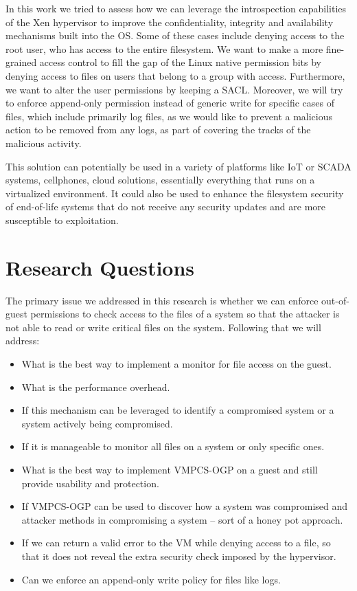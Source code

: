 \par In this work we tried to assess how we can leverage the introspection capabilities of the Xen hypervisor to improve the confidentiality, integrity and availability mechanisms built into the \ac{OS}. Some of these cases include denying access to the root user, who has access to the entire filesystem. We want to make a more fine-grained access control to fill the gap of the Linux native permission bits by denying access to files on users that belong to a group with access. Furthermore, we want to alter the user permissions by keeping a \ac{SACL}. Moreover, we will try to enforce append-only permission instead of generic write for specific cases of files, which include primarily log files, as we would like to prevent a malicious action to be removed from any logs, as part of covering the tracks of the malicious activity. 

\par This solution can potentially be used in a variety of platforms like \ac{IoT} or \ac{SCADA} systems, cellphones, cloud solutions, essentially everything that runs on a virtualized environment. It could also be used to enhance the filesystem security of end-of-life systems that do not receive any security updates and are more susceptible to exploitation.

\section{Research Questions}\label{sec:question}
\par The primary issue we addressed in this research is whether we can enforce out-of-guest permissions to check access to the files of a system so that the attacker is not able to read or write critical files on the system. Following that we will address:
\begin{itemize}
	\item What is the best way to implement a monitor for file access on the guest.
	\item What is the performance overhead.
	\item If this mechanism can be leveraged to identify a compromised system or a system actively being compromised.
	\item If it is manageable to monitor all files on a system or only specific ones. 
	\item What is the best way to implement \ac{VMPCS-OGP} on a guest and still provide usability and protection.
	\item If \ac{VMPCS-OGP} can be used to discover how a system was compromised and attacker methods in compromising a system – sort of a honey pot approach.
	\item If we can return a valid error to the VM while denying access to a file, so that it does not reveal the extra security check imposed by the hypervisor.
	\item Can we enforce an append-only write policy for files like logs.
\end{itemize}

